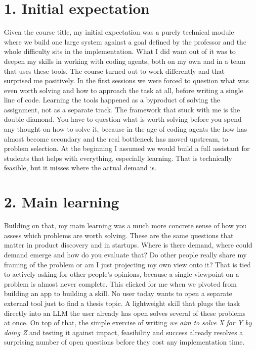 \documentclass[11pt,a4paper]{article}
\begin{document}

\section*{1. Initial expectation}

Given the course title, my initial expectation was a purely technical module
where we build one large system against a goal defined by the professor and the
whole difficulty sits in the implementation. What I did want out of it
was to deepen my skills in working with coding agents, both on my own and in a
team that uses these tools. The course turned out to work differently and that
surprised me positively. In the first sessions we were forced to question what was even worth
solving and how to approach the task at all, before writing a single line of
code. Learning the tools happened as a byproduct of solving the assignment, not
as a separate track. The framework that stuck with me is the double diamond. You
have to question what is worth solving before you spend any thought on how to
solve it, because in the age of coding agents the how has almost become
secondary and the real bottleneck has moved upstream, to problem selection. At
the beginning I assumed we would build a full assistant for students that helps with everything, especially
learning. That is technically feasible, but it misses where the actual demand
is.

\section*{2. Main learning}

Building on that, my main learning was a much more concrete sense of how you
assess which problems are worth solving. These are the same questions that
matter in product discovery and in startups. Where is there demand, where could
demand emerge and how do you evaluate that? Do other people really share my
framing of the problem or am I just projecting my own view onto it? That is tied
to actively asking for other people's opinions, because a single viewpoint on a
problem is almost never complete. This clicked for me when we pivoted from building an app to building a
skill. No user today wants to open a separate external tool just to find a
thesis topic. A lightweight skill that plugs the task directly into an LLM the
user already has open solves several of these problems at once. On top of that,
the simple exercise of writing \emph{we aim to solve X for Y by doing Z} and
testing it against impact, feasibility and success already resolves a surprising
number of open questions before they cost any implementation time.
\end{document}
